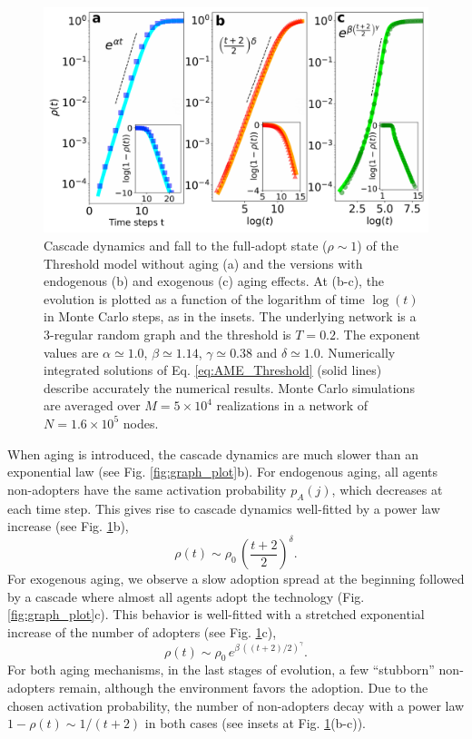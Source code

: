 \begin{figure}
\includegraphics[width=\columnwidth]{Figs/Aging_Threshold/EVO_MOD.pdf}
\caption{\label{fig:models} Cascade dynamics and fall to the full-adopt state ($\rho \sim 1$) of the Threshold model without aging (a) and the versions with endogenous (b) and exogenous (c) aging effects. At (b-c), the evolution is plotted as a function of the logarithm of time $\log{(t)}$ in Monte Carlo steps, as in the insets. The underlying network is a 3-regular random graph and the threshold is $T = 0.2$. The exponent values are $\alpha \simeq 1.0$, $\beta \simeq 1.14$, $\gamma \simeq 0.38$ and $\delta \simeq 1.0$. Numerically integrated solutions of Eq. \eqref{eq:AME_Threshold} (solid lines) describe accurately the numerical results. Monte Carlo simulations are averaged over $M = 5 \times 10^4$ realizations in a network of $N = 1.6 \times 10^5$ nodes.}
\end{figure}

When aging is introduced, the cascade dynamics are much slower than an exponential law (see Fig. \ref{fig:graph_plot}b). For endogenous aging, all agents non-adopters have the same activation probability $p_A(j)$, which decreases at each time step. This gives rise to cascade dynamics well-fitted by a power law increase (see Fig. \ref{fig:models}b),
\begin{equation}
\rho(t) \sim \rho_0 \, \left( \frac{t + 2}{2}\right)^\delta .
\label{eq:power law}
\end{equation}
For exogenous aging, we observe a slow adoption spread at the beginning followed by a cascade where almost all agents adopt the technology (Fig. \ref{fig:graph_plot}c). This behavior is well-fitted with a stretched exponential increase of the number of adopters (see Fig. \ref{fig:models}c),
\begin{equation}
\rho(t) \sim  \rho_0\,  e^{\beta \, ((t + 2) / 2)^{\gamma}} .
\label{eq:streched_exp}
\end{equation}
For both aging mechanisms, in the last stages of evolution, a few ``stubborn'' non-adopters remain, although the environment favors the adoption. Due to the chosen activation probability, the number of non-adopters decay with a power law $1 - \rho(t) \sim 1/(t+2)$ in both cases (see insets at Fig. \ref{fig:models}(b-c)).

